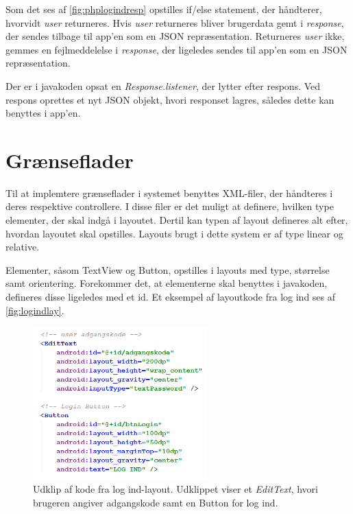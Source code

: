 \noindent
Som det ses af \autoref{fig:phplogindresp} opstilles if/else statement, der håndterer, hvorvidt \textit{user} returneres. Hvis \textit{user} returneres bliver brugerdata gemt i \textit{response}, der sendes tilbage til app'en som en JSON repræsentation. Returneres \textit{user} ikke, gemmes en fejlmeddelelse i \textit{response}, der ligeledes sendes til app'en som en JSON repræsentation. 

Der er i javakoden opsat en \textit{Response.listener}, der lytter efter respons. Ved respons oprettes et nyt JSON objekt, hvori responset lagres, således dette kan benyttes i app'en. 


\section{Grænseflader}
Til at implemtere grænseflader i systemet benyttes XML-filer, der håndteres i deres respektive controllere. I disse filer er det muligt at definere, hvilken type elementer, der skal indgå i layoutet. Dertil kan typen af layout defineres alt efter, hvordan layoutet skal opstilles. Layouts brugt i dette system er af type linear og relative.  

Elementer, såsom TextView og Button, opstilles i layouts med type, størrelse samt orientering. Forekommer det, at elementerne skal benyttes i javakoden, defineres disse ligeledes med et id. Et eksempel af layoutkode fra log ind ses af \autoref{fig:logindlay}.

\begin{figure} [H]
\centering
\includegraphics[width=0.6\textwidth]{figures/imple/logindlay}
\caption{Udklip af kode fra log ind-layout. Udklippet viser et \textit{EditText}, hvori brugeren angiver adgangskode samt en Button for log ind.}
\label{fig:logindlay}
\end{figure}

